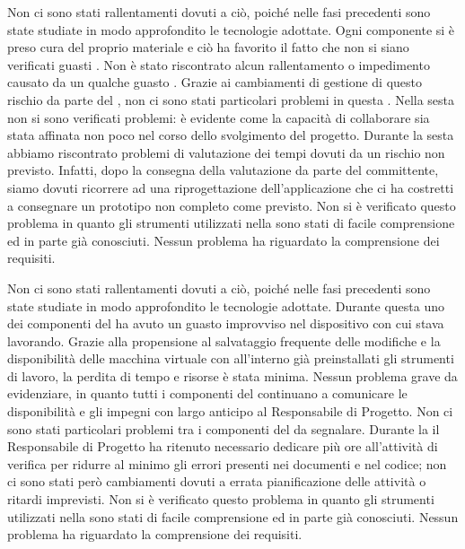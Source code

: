 		Non ci sono stati rallentamenti dovuti a ciò, poiché nelle fasi precedenti sono state studiate in modo approfondito le tecnologie adottate.
		Ogni componente si è preso cura del proprio materiale e ciò ha favorito il fatto che non si siano verificati guasti . Non è stato riscontrato alcun rallentamento o impedimento causato da un qualche guasto .
		Grazie ai cambiamenti di gestione di questo rischio da parte del , non ci sono stati particolari problemi in questa .
		Nella sesta  non si sono verificati problemi: è evidente come la capacità di collaborare sia stata affinata non poco nel corso dello svolgimento del progetto.
		Durante la sesta  abbiamo riscontrato problemi di valutazione dei tempi dovuti da un rischio non previsto. Infatti, dopo la consegna della valutazione da parte del committente, siamo dovuti ricorrere ad una riprogettazione dell'applicazione  che ci ha costretti a consegnare un prototipo non completo come previsto.
		Non si è verificato questo problema in quanto gli strumenti utilizzati nella  sono stati di facile comprensione ed in parte già conosciuti.
		Nessun problema ha riguardato la comprensione dei requisiti.

		Non ci sono stati rallentamenti dovuti a ciò, poiché nelle fasi precedenti sono state studiate in modo approfondito le tecnologie adottate.
		Durante questa  uno dei componenti del  ha avuto un guasto  improvviso nel dispositivo con cui stava lavorando. Grazie alla propensione al salvataggio frequente delle modifiche e la disponibilità delle macchina virtuale con all'interno già preinstallati gli strumenti di lavoro, la perdita di tempo e risorse è stata minima.
		Nessun problema grave da evidenziare, in quanto tutti i componenti del  continuano a comunicare le disponibilità e gli impegni con largo anticipo al Responsabile di Progetto.
		Non ci sono stati particolari problemi tra i componenti del  da segnalare.
		Durante la  il Responsabile di Progetto ha ritenuto necessario dedicare più ore all'attività di verifica per ridurre al minimo gli errori presenti nei documenti e nel codice; non ci sono stati però cambiamenti dovuti a errata pianificazione delle attività o ritardi imprevisti.
		Non si è verificato questo problema in quanto gli strumenti utilizzati nella  sono stati di facile comprensione ed in parte già conosciuti.
		Nessun problema ha riguardato la comprensione dei requisiti.
